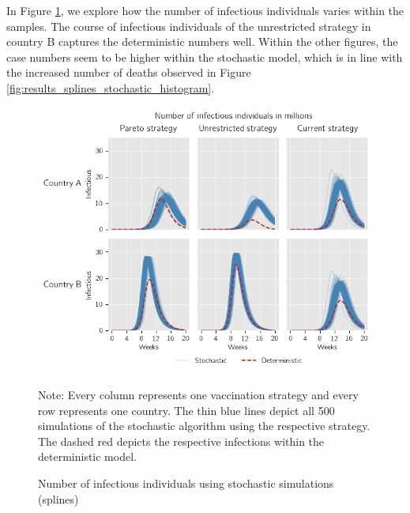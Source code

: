 In Figure \ref{fig:results_splines_infectious_dead_stochastic}, we explore how the number of infectious individuals varies within the samples. The course of infectious individuals of the unrestricted strategy in country B captures the deterministic numbers well. Within the other figures, the case numbers seem to be higher within the stochastic model, which is in line with the increased number of deaths observed in Figure \ref{fig:results_splines_stochastic_histogram}.

\begin{figure}[h!]
\centering
\includegraphics[scale=0.85]{images/splines_stochastic_infectious.png}
\begin{flushleft}
\scriptsize{Note:} Every column represents one vaccination strategy and every row represents one country. The thin blue lines depict all 500 simulations of the stochastic algorithm using the respective strategy. The dashed red depicts the respective infections within the deterministic model. 
\end{flushleft}
\caption{Number of infectious individuals using stochastic simulations (splines)}
\label{fig:results_splines_infectious_dead_stochastic}
\end{figure}















